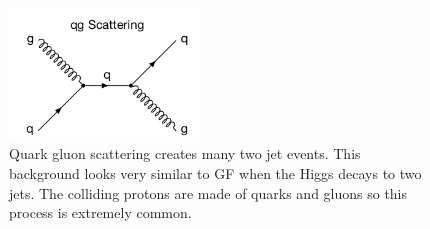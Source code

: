 \begin{figure}[h!]
  \centering
  \includegraphics[width=2in]{images/qg_scattering.png}
  \caption
   {Quark gluon scattering creates many two jet events. This background looks very similar to GF when the Higgs decays to two jets. The colliding protons are made of quarks and gluons so this process is extremely common.}
  \label{fig:feynqg}
\end{figure}

